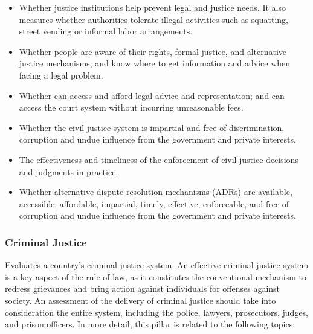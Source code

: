\documentclass[
]{agujournal2019}
\providecommand{\tightlist}{%
  \setlength{\itemsep}{0pt}\setlength{\parskip}{0pt}}\usepackage{longtable,booktabs,array}
\begin{document}
\begin{itemize}
\tightlist
\item
  Whether justice institutions help prevent legal and justice needs. It
  also measures whether authorities tolerate illegal activities such as
  squatting, street vending or informal labor arrangements.
\item
  Whether people are aware of their rights, formal justice, and
  alternative justice mechanisms, and know where to get information and
  advice when facing a legal problem.
\item
  Whether can access and afford legal advice and representation; and can
  access the court system without incurring unreasonable fees.
\item
  Whether the civil justice system is impartial and free of
  discrimination, corruption and undue influence from the government and
  private interests.
\item
  The effectiveness and timeliness of the enforcement of civil justice
  decisions and judgments in practice.
\item
  Whether alternative dispute resolution mechanisms (ADRs) are
  available, accessible, affordable, impartial, timely, effective,
  enforceable, and free of corruption and undue influence from the
  government and private interests.
\end{itemize}

\subsubsection{Criminal Justice}\label{criminal-justice}

Evaluates a country's criminal justice system. An effective criminal
justice system is a key aspect of the rule of law, as it constitutes the
conventional mechanism to redress grievances and bring action against
individuals for offenses against society. An assessment of the delivery
of criminal justice should take into consideration the entire system,
including the police, lawyers, prosecutors, judges, and prison officers.
In more detail, this pillar is related to the following topics:
\end{document}
